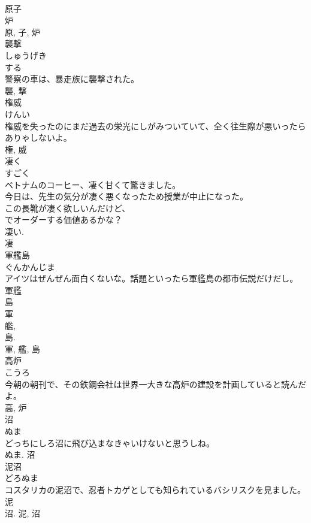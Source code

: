 \documentclass[8pt]{extreport}
\begin{document}
\begin{CJK}{UTF8}{min}
\\	原子 
\\	炉 
\\	原, 子, 炉	
\\	襲撃	
\\	しゅうげき	
\\	する 
\\	警察の車は、暴走族に襲撃された。	
\\	襲, 撃	
\\	権威	
\\	けんい	
\\	権威を失ったのにまだ過去の栄光にしがみついていて、全く往生際が悪いったらありゃしないよ。	
\\	権, 威	
\\	凄く	
\\	すごく	
\\	ベトナムのコーヒー、凄く甘くて驚きました。	
\\	今日は、先生の気分が凄く悪くなったため授業が中止になった。	
\\	この長靴が凄く欲しいんだけど、
\\	でオーダーする価値あるかな？	
\\	凄い. 
\\	凄	
\\	軍艦島	
\\	ぐんかんじま	
\\	アイツはぜんぜん面白くないな。話題といったら軍艦島の都市伝説だけだし。	
\\	軍艦 
\\	島 
\\	軍 
\\	艦, 
\\	島. 
\\	軍, 艦, 島	
\\	高炉	
\\	こうろ	
\\	今朝の朝刊で、その鉄鋼会社は世界一大きな高炉の建設を計画していると読んだよ。	
\\	高, 炉	
\\	沼	
\\	ぬま	
\\	どっちにしろ沼に飛び込まなきゃいけないと思うしね。	
\\	ぬま.	沼	
\\	泥沼	
\\	どろぬま	
\\	コスタリカの泥沼で、忍者トカゲとしても知られているバシリスクを見ました。	
\\	泥 
\\	沼.	泥, 沼	

\end{CJK}
\end{document}

